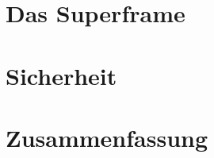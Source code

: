 \documentclass[a4paper, 12pt]{scrreprt}
\begin{document}
\chapter{Das Superframe}

\chapter{Sicherheit}

\chapter{Zusammenfassung}



\newpage

\end{document}
